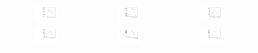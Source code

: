 \begin{figure}
\begin{tabular}{ccc}
\includegraphics[width=0.3\textwidth]{ANA_resources/Plots/Monte_carlo/data_vs_MC/Kpi/log10(D0K_IPCHI2_OWNPV)_2016.pdf} & \includegraphics[width=0.3\textwidth]{ANA_resources/Plots/Monte_carlo/data_vs_MC/Kpi/log10(D0Pi_IPCHI2_OWNPV)_2016.pdf} & \includegraphics[width=0.3\textwidth]{ANA_resources/Plots/Monte_carlo/data_vs_MC/Kpi/log10(KstarPi_IPCHI2_OWNPV)_2016.pdf} \\
\includegraphics[width=0.3\textwidth]{ANA_resources/Plots/Monte_carlo/data_vs_MC/Kpi/log10(D0K_PT)_2016.pdf} & \includegraphics[width=0.3\textwidth]{ANA_resources/Plots/Monte_carlo/data_vs_MC/Kpi/log10(D0Pi_PT)_2016.pdf} & \includegraphics[width=0.3\textwidth]{ANA_resources/Plots/Monte_carlo/data_vs_MC/Kpi/log10(KstarK_PT)_2016.pdf} \\

\end{tabular}
\end{figure}
